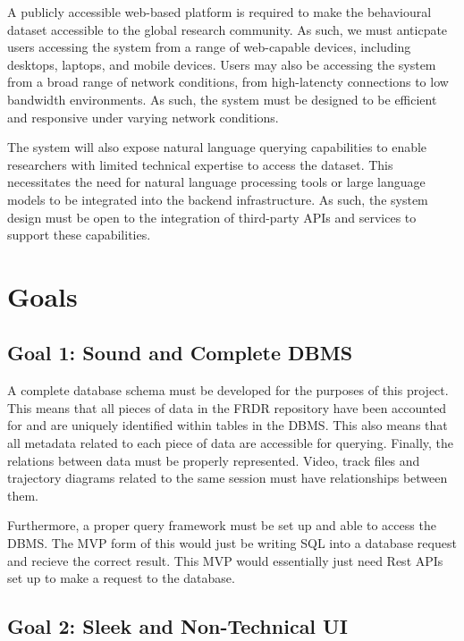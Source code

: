 \documentclass{article}
\begin{document}
\par{
  A publicly accessible web-based platform is required to make the behavioural dataset accessible to the global research community. As such, we must anticpate users accessing the system from a range of web-capable devices, including desktops, laptops, and mobile devices. Users may also be accessing the system from a broad range of network conditions, from high-latencty connections to low bandwidth environments. As such, the system must be designed to be efficient and responsive under varying network conditions. 
}

\par{
  The system will also expose natural language querying capabilities to enable researchers with limited technical expertise to access the dataset. This necessitates the need for natural language processing tools or large language models to be integrated into the backend infrastructure. As such, the system design must be open to the integration of third-party APIs and services to support these capabilities.
}


\section{Goals}

  \subsection{Goal 1: Sound and Complete DBMS} 
  
  \par{ A complete database schema must be developed for the purposes
  of this project. This means that all pieces of data in the FRDR repository have
  been accounted for and are uniquely identified within tables in the DBMS. This also means that
  all metadata related to each piece of data are accessible for querying. Finally,
  the relations between data must be properly represented. Video, track files and trajectory diagrams
  related to the same session must have relationships between them.
  
  Furthermore, a proper query framework must be set up and able to access the DBMS. 
  The MVP form of this would just be writing SQL into a database request and
  recieve the correct result. This MVP would essentially just need Rest APIs set up
  to make a request to the database.}

  \subsection{Goal 2: Sleek and Non-Technical UI}
  
\end{document}
